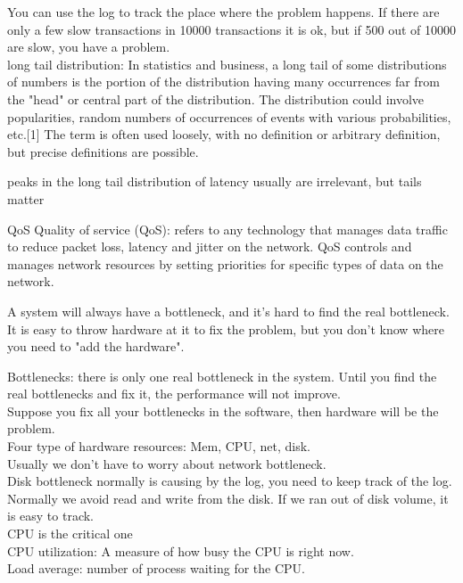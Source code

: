 \documentclass[fancy,11pt,titlestyle=display]{style/elegantbook}
\begin{document}
You can use the log to track the place where the problem happens. If there are only a few slow transactions in 10000 transactions it is ok, but if 500 out of 10000 are slow, you have a problem.\\

long tail distribution:
In statistics and business, a long tail of some distributions of numbers is the portion of the distribution having many occurrences far from the "head" or central part of the distribution. The distribution could involve popularities, random numbers of occurrences of events with various probabilities, etc.[1] The term is often used loosely, with no definition or arbitrary definition, but precise definitions are possible.


peaks in the long tail distribution of latency usually are irrelevant, but tails matter

\begin{definition}{QoS}{}
Quality of service (QoS): refers to any technology that manages data traffic to reduce packet loss, latency and jitter on the network. QoS controls and manages network resources by setting priorities for specific types of data on the network.
\end{definition}

A system will always have a bottleneck, and it's hard to find the real bottleneck. It is easy to throw hardware at it to fix the problem, but you don't know where you need to "add the hardware".

Bottlenecks: there is only one real bottleneck in the system. Until you find the real bottlenecks and fix it, the performance will not improve.\\

Suppose you fix all your bottlenecks in the software, then hardware will be the problem.\\
Four type of hardware resources: Mem, CPU, net, disk.\\
Usually we don't have to worry about network bottleneck.\\
Disk bottleneck normally is causing by the log, you need to keep track of the log. Normally we avoid read and write from the disk. If we ran out of disk volume, it is easy to track.\\
CPU is the critical one\\

CPU utilization: A measure of how busy the CPU is right now.\\
Load average: number of process waiting for the CPU.\\
\end{document}
